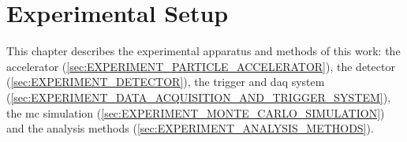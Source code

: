 \documentclass[../../thesis.tex]{subfiles}
\begin{document}
\chapter{Experimental Setup}
\label{sec:EXPERIMENT}

\chaptertitleblock
  {\QuoteChIII}
  {\AttribChIII}
  {This chapter describes the experimental apparatus and methods of this work: the accelerator (\cref{sec:EXPERIMENT_PARTICLE_ACCELERATOR}), the detector (\cref{sec:EXPERIMENT_DETECTOR}), the trigger and \gls{daq} system (\cref{sec:EXPERIMENT_DATA_ACQUISITION_AND_TRIGGER_SYSTEM}), the \gls{mc} simulation (\cref{sec:EXPERIMENT_MONTE_CARLO_SIMULATION}) and the analysis methods (\cref{sec:EXPERIMENT_ANALYSIS_METHODS}).}

\clearpage






\end{document}
